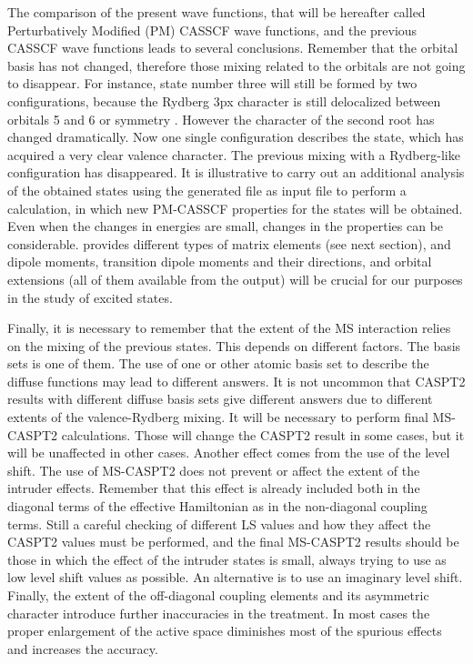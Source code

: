 
The comparison of the present wave functions, that will be hereafter
called Perturbatively Modified (PM) CASSCF wave functions, and the
previous CASSCF wave functions leads to several conclusions. Remember
that the orbital basis has not changed, therefore those mixing related
to the orbitals are not going to disappear. For instance, state number
three will still be formed by two configurations, because the Rydberg
3px character is still delocalized between orbitals 5 and 6 or symmetry
\bo. However the character of the second root has changed dramatically.
Now one single configuration describes the state, which has acquired a
very clear valence character. The previous mixing with a Rydberg-like
configuration has disappeared. It is illustrative to carry out
an additional analysis of the obtained states using the generated 
file  as input file to perform
a  calculation, in which new PM-CASSCF properties
for the states will be obtained. Even when the changes in energies
are small, changes in the properties can be considerable.
 provides different types of matrix elements
(see next section), and dipole moments, transition dipole moments
and their directions, and orbital extensions (all of them available
from the  output) will be crucial for our purposes
in the study of excited states.

Finally, it is necessary to remember that the extent of the MS interaction
relies on the mixing of the previous states. This depends on different
factors. The basis sets is one of them. The use of one or other atomic
basis set to describe the diffuse functions may lead to different answers.
It is not uncommon that CASPT2 results with different diffuse basis sets
give different answers due to different extents of the valence-Rydberg
mixing. It will be necessary to perform final MS-CASPT2 calculations.
Those will change the CASPT2 result in some cases, but it will be
unaffected in other cases. Another effect comes from the use
of the level shift. The use of MS-CASPT2 does not prevent or
affect the extent of the intruder effects. Remember that this effect
is already included both in the diagonal terms of the effective 
Hamiltonian as in the non-diagonal coupling terms. Still a careful checking
of different LS values and how they affect the CASPT2 values must be
performed, and the final MS-CASPT2 results should be those in which
the effect of the intruder states is small, always trying to use as low level 
shift values as possible. An alternative is to use an imaginary level shift. 
Finally, the extent of the off-diagonal coupling elements and its asymmetric 
character introduce further inaccuracies in the treatment. In most cases the
proper enlargement of the active space diminishes most of the spurious
effects and increases the accuracy.

